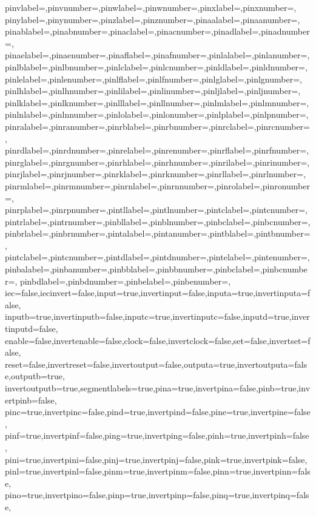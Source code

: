 {  pinvlabel={},pinvnumber={},pinwlabel={},pinwnumber={},pinxlabel={},pinxnumber={},
  pinylabel={},pinynumber={},pinzlabel={},pinznumber={},pinaalabel={},pinaanumber={},
  pinablabel={},pinabnumber={},pinaclabel={},pinacnumber={},pinadlabel={},pinadnumber={},
  pinaelabel={},pinaenumber={},pinaflabel={},pinafnumber={},pinlalabel={},pinlanumber={},
  pinlblabel={},pinlbnumber={},pinlclabel={},pinlcnumber={},pinldlabel={},pinldnumber={},
  pinlelabel={},pinlenumber={},pinlflabel={},pinlfnumber={},pinlglabel={},pinlgnumber={},
  pinlhlabel={},pinlhnumber={},pinlilabel={},pinlinumber={},pinljlabel={},pinljnumber={},
  pinlklabel={},pinlknumber={},pinlllabel={},pinllnumber={},pinlmlabel={},pinlmnumber={},
  pinlnlabel={},pinlnnumber={},pinlolabel={},pinlonumber={},pinlplabel={},pinlpnumber={},
  pinralabel={},pinranumber={},pinrblabel={},pinrbnumber={},pinrclabel={},pinrcnumber={},
  pinrdlabel={},pinrdnumber={},pinrelabel={},pinrenumber={},pinrflabel={},pinrfnumber={},
  pinrglabel={},pinrgnumber={},pinrhlabel={},pinrhnumber={},pinrilabel={},pinrinumber={},
  pinrjlabel={},pinrjnumber={},pinrklabel={},pinrknumber={},pinrllabel={},pinrlnumber={},
  pinrmlabel={},pinrmnumber={},pinrnlabel={},pinrnnumber={},pinrolabel={},pinronumber={},
  pinrplabel={},pinrpnumber={},pintllabel={},pintlnumber={},pintclabel={},pintcnumber={},
  pintrlabel={},pintrnumber={},pinbllabel={},pinblnumber={},pinbclabel={},pinbcnumber={},
  pinbrlabel={},pinbrnumber={},pintalabel={},pintanumber={},pintblabel={},pintbnumber={},
  pintclabel={},pintcnumber={},pintdlabel={},pintdnumber={},pintelabel={},pintenumber={},
  pinbalabel={},pinbanumber={},pinbblabel={},pinbbnumber={},pinbclabel={},pinbcnumber={},
  pinbdlabel={},pinbdnumber={},pinbelabel={},pinbenumber={},
  iec=false,iecinvert=false,input=true,invertinput=false,inputa=true,invertinputa=false,
  inputb=true,invertinputb=false,inputc=true,invertinputc=false,inputd=true,invertinputd=false,
  enable=false,invertenable=false,clock=false,invertclock=false,set=false,invertset=false,
  reset=false,invertreset=false,invertoutput=false,outputa=true,invertoutputa=false,outputb=true,
  invertoutputb=true,segmentlabels=true,pina=true,invertpina=false,pinb=true,invertpinb=false,
  pinc=true,invertpinc=false,pind=true,invertpind=false,pine=true,invertpine=false,
  pinf=true,invertpinf=false,ping=true,invertping=false,pinh=true,invertpinh=false,
  pini=true,invertpini=false,pinj=true,invertpinj=false,pink=true,invertpink=false,
  pinl=true,invertpinl=false,pinm=true,invertpinm=false,pinn=true,invertpinn=false,
  pino=true,invertpino=false,pinp=true,invertpinp=false,pinq=true,invertpinq=false,
}
